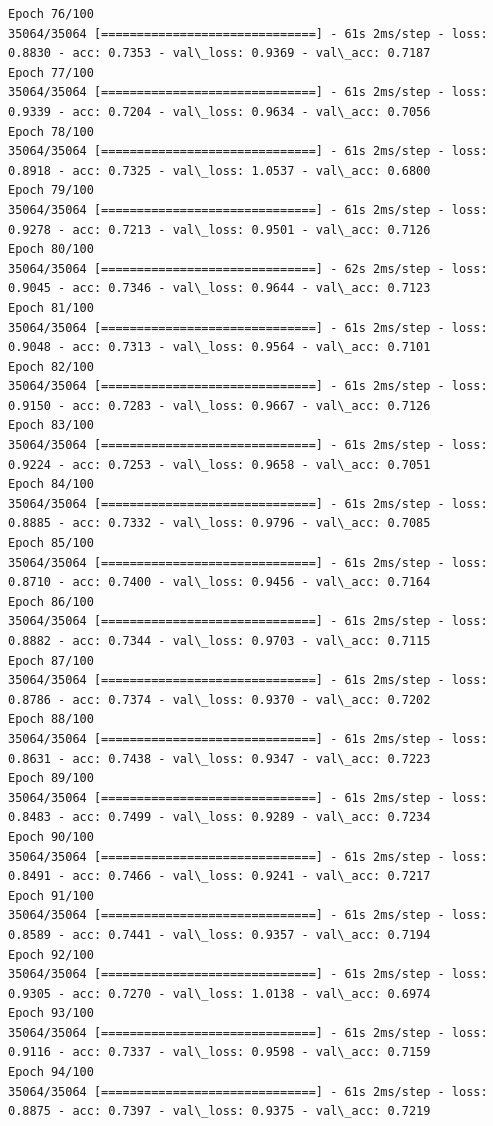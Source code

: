 \documentclass[11pt]{article}
\begin{document}
\begin{Verbatim}[commandchars=\\\{\}]
Epoch 76/100
35064/35064 [==============================] - 61s 2ms/step - loss: 0.8830 - acc: 0.7353 - val\_loss: 0.9369 - val\_acc: 0.7187
Epoch 77/100
35064/35064 [==============================] - 61s 2ms/step - loss: 0.9339 - acc: 0.7204 - val\_loss: 0.9634 - val\_acc: 0.7056
Epoch 78/100
35064/35064 [==============================] - 61s 2ms/step - loss: 0.8918 - acc: 0.7325 - val\_loss: 1.0537 - val\_acc: 0.6800
Epoch 79/100
35064/35064 [==============================] - 61s 2ms/step - loss: 0.9278 - acc: 0.7213 - val\_loss: 0.9501 - val\_acc: 0.7126
Epoch 80/100
35064/35064 [==============================] - 62s 2ms/step - loss: 0.9045 - acc: 0.7346 - val\_loss: 0.9644 - val\_acc: 0.7123
Epoch 81/100
35064/35064 [==============================] - 61s 2ms/step - loss: 0.9048 - acc: 0.7313 - val\_loss: 0.9564 - val\_acc: 0.7101
Epoch 82/100
35064/35064 [==============================] - 61s 2ms/step - loss: 0.9150 - acc: 0.7283 - val\_loss: 0.9667 - val\_acc: 0.7126
Epoch 83/100
35064/35064 [==============================] - 61s 2ms/step - loss: 0.9224 - acc: 0.7253 - val\_loss: 0.9658 - val\_acc: 0.7051
Epoch 84/100
35064/35064 [==============================] - 61s 2ms/step - loss: 0.8885 - acc: 0.7332 - val\_loss: 0.9796 - val\_acc: 0.7085
Epoch 85/100
35064/35064 [==============================] - 61s 2ms/step - loss: 0.8710 - acc: 0.7400 - val\_loss: 0.9456 - val\_acc: 0.7164
Epoch 86/100
35064/35064 [==============================] - 61s 2ms/step - loss: 0.8882 - acc: 0.7344 - val\_loss: 0.9703 - val\_acc: 0.7115
Epoch 87/100
35064/35064 [==============================] - 61s 2ms/step - loss: 0.8786 - acc: 0.7374 - val\_loss: 0.9370 - val\_acc: 0.7202
Epoch 88/100
35064/35064 [==============================] - 61s 2ms/step - loss: 0.8631 - acc: 0.7438 - val\_loss: 0.9347 - val\_acc: 0.7223
Epoch 89/100
35064/35064 [==============================] - 61s 2ms/step - loss: 0.8483 - acc: 0.7499 - val\_loss: 0.9289 - val\_acc: 0.7234
Epoch 90/100
35064/35064 [==============================] - 61s 2ms/step - loss: 0.8491 - acc: 0.7466 - val\_loss: 0.9241 - val\_acc: 0.7217
Epoch 91/100
35064/35064 [==============================] - 61s 2ms/step - loss: 0.8589 - acc: 0.7441 - val\_loss: 0.9357 - val\_acc: 0.7194
Epoch 92/100
35064/35064 [==============================] - 61s 2ms/step - loss: 0.9305 - acc: 0.7270 - val\_loss: 1.0138 - val\_acc: 0.6974
Epoch 93/100
35064/35064 [==============================] - 61s 2ms/step - loss: 0.9116 - acc: 0.7337 - val\_loss: 0.9598 - val\_acc: 0.7159
Epoch 94/100
35064/35064 [==============================] - 61s 2ms/step - loss: 0.8875 - acc: 0.7397 - val\_loss: 0.9375 - val\_acc: 0.7219

\end{Verbatim}
\end{document}
